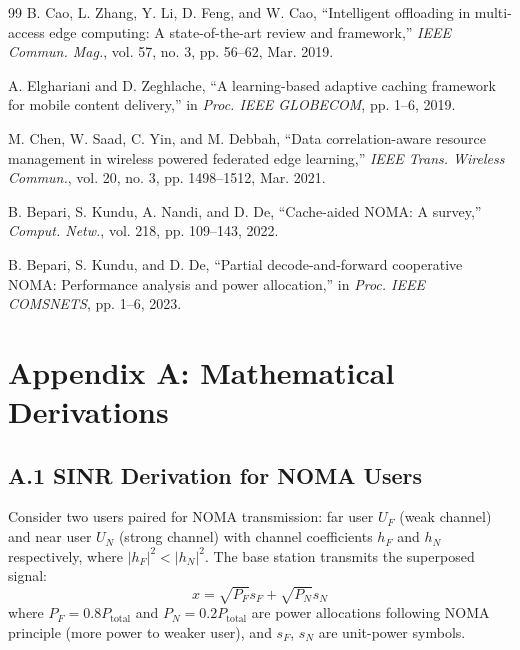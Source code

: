 \documentclass[12pt,a4paper]{article}
\begin{document}
\begin{thebibliography}{99}
B. Cao, L. Zhang, Y. Li, D. Feng, and W. Cao, ``Intelligent offloading in multi-access edge computing: A state-of-the-art review and framework,'' \textit{IEEE Commun. Mag.}, vol. 57, no. 3, pp. 56--62, Mar. 2019.

A. Elghariani and D. Zeghlache, ``A learning-based adaptive caching framework for mobile content delivery,'' in \textit{Proc. IEEE GLOBECOM}, pp. 1--6, 2019.

M. Chen, W. Saad, C. Yin, and M. Debbah, ``Data correlation-aware resource management in wireless powered federated edge learning,'' \textit{IEEE Trans. Wireless Commun.}, vol. 20, no. 3, pp. 1498--1512, Mar. 2021.

B. Bepari, S. Kundu, A. Nandi, and D. De, ``Cache-aided NOMA: A survey,'' \textit{Comput. Netw.}, vol. 218, pp. 109--143, 2022.

B. Bepari, S. Kundu, and D. De, ``Partial decode-and-forward cooperative NOMA: Performance analysis and power allocation,'' in \textit{Proc. IEEE COMSNETS}, pp. 1--6, 2023.

\end{thebibliography}

\thispagestyle{plain}


\clearpage

\section*{Appendix A: Mathematical Derivations}

\subsection*{A.1 SINR Derivation for NOMA Users}

Consider two users paired for NOMA transmission: far user $U_F$ (weak channel) and near user $U_N$ (strong channel) with channel coefficients $h_F$ and $h_N$ respectively, where $|h_F|^2 < |h_N|^2$. The base station transmits the superposed signal:
\begin{equation}
x = \sqrt{P_F} s_F + \sqrt{P_N} s_N
\end{equation}
where $P_F = 0.8P_{\text{total}}$ and $P_N = 0.2P_{\text{total}}$ are power allocations following NOMA principle (more power to weaker user), and $s_F$, $s_N$ are unit-power symbols.
\end{document}
